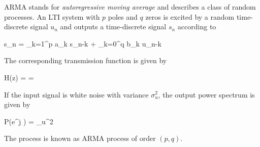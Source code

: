 
ARMA stands for \emph{autoregressive moving average} and describes a class of random processes. An LTI system with $p$ poles and $q$ zeros is excited by a random time-discrete signal $u_n$ and outputs a time-discrete signal $s_n$ according to

\bee
s_n = \sum_{k=1}^p a_k s_{n-k} + \sum_{k=0}^q b_k u_{n-k}
\eee

The corresponding transmission function is given by

\bee
H(z) =  = 
\eee

If the input signal is white noise with variance $\sigma_u^2$, the output power spectrum is given by

\bee
P(e^{j \omega}) = \sigma_u^2 
\eee

The process is known as ARMA process of order $(p,q)$.


